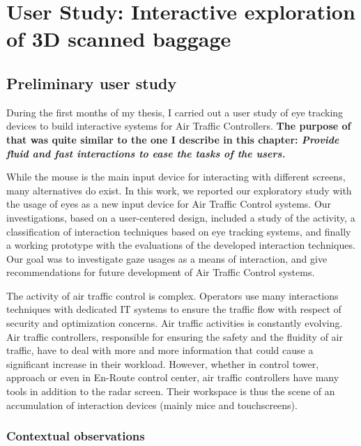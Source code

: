 \chapter{User Study: Interactive exploration of 3D scanned baggage} %
\label{DesignStudy}

\section{ Preliminary user study }
During the first months of my thesis, I carried out a user study of eye tracking devices to build interactive systems for Air Traffic Controllers. \textbf{ The purpose of that was quite similar to the one I describe in this chapter: \textit{Provide fluid and fast interactions to ease the tasks of the users.} }


While the mouse is the main input device for interacting with different screens, many alternatives do exist. In this work, we reported our exploratory study with the usage of
eyes as a new input device for Air Traffic Control systems. Our investigations, based on a user-centered design, included a study of the activity, a classification of interaction
techniques based on eye tracking systems, and finally a working prototype with the evaluations of the developed interaction techniques. Our goal was to investigate gaze usages
as a means of interaction, and give recommendations for future development of Air Traffic Control systems.


The activity of air traffic control is complex. Operators use many interactions techniques with dedicated IT systems to ensure the traffic flow with respect of security and
optimization concerns. Air traffic activities is constantly evolving. Air traffic
controllers, responsible for ensuring the safety and the fluidity of air traffic, have to deal with more and more information that could cause a significant increase in their
workload. However, whether in control tower, approach or even in En-Route control center, air traffic controllers have many tools in addition to the radar screen. Their
workspace is thus the scene of an accumulation of interaction devices (mainly mice and touchscreens).

\subsection{ Contextual observations }

